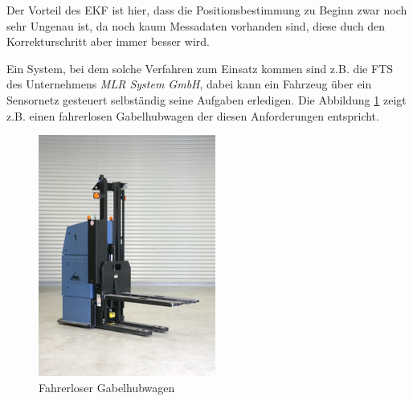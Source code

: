 Der Vorteil des \ac{EKF} ist hier, dass die Positionsbestimmung zu
Beginn zwar noch sehr Ungenau ist, da noch kaum Messadaten vorhanden
sind, diese duch den Korrekturschritt aber immer besser wird.

Ein System, bei dem solche Verfahren zum Einsatz kommen sind z.B. die
\ac{FTS} des Unternehmens \textit{MLR System GmbH}, dabei kann ein
Fahrzeug über ein Sensornetz gesteuert selbständig seine Aufgaben
erledigen. Die Abbildung \ref{fig:fg} zeigt z.B. einen fahrerlosen
Gabelhubwagen der diesen Anforderungen entspricht.

\begin{figure}[h!]
  \centering
  \includegraphics[scale=1.0]{img/Fahr_Gabelhubwagen}

  \caption{Fahrerloser Gabelhubwagen}
  \label{fig:fg}
\end{figure}
